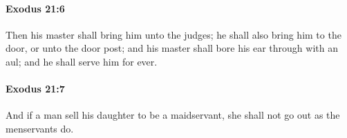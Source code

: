 		\paragraph{Exodus 21:6} %
			\label{EXODUS-21-6}

			Then his master shall bring him unto the judges; he shall also bring him to the door, or unto the door post; and his master shall bore his ear through with an aul; and he shall serve him for ever.


		\paragraph{Exodus 21:7} %
			\label{EXODUS-21-7}

			And if a man sell his daughter to be a maidservant, she shall not go out as the menservants do.


